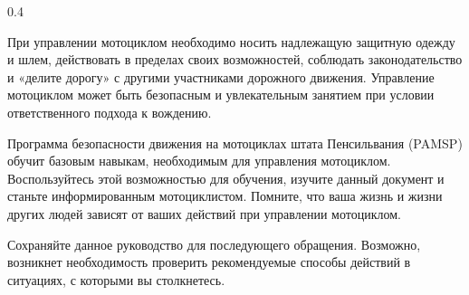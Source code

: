 \begin{langblock}{0.4}
\begin{rus}
		При управлении мотоциклом необходимо носить надлежащую защитную одежду и шлем, действовать в пределах своих возможностей, соблюдать законодательство и «делите дорогу» с другими участниками дорожного движения. Управление мотоциклом может быть безопасным и увлекательным занятием при условии ответственного подхода к вождению.
		
		Программа безопасности движения на мотоциклах штата Пенсильвания (PAMSP) обучит базовым навыкам, необходимым для управления мотоциклом. Воспользуйтесь этой возможностью для обучения, изучите данный документ и станьте информированным мотоциклистом. Помните, что ваша жизнь и жизни других людей зависят от ваших действий при управлении мотоциклом.
		
		Сохраняйте данное руководство для последующего обращения. Возможно, возникнет необходимость проверить рекомендуемые способы действий в ситуациях, с которыми вы столкнетесь.
	\end{rus}
\end{langblock}